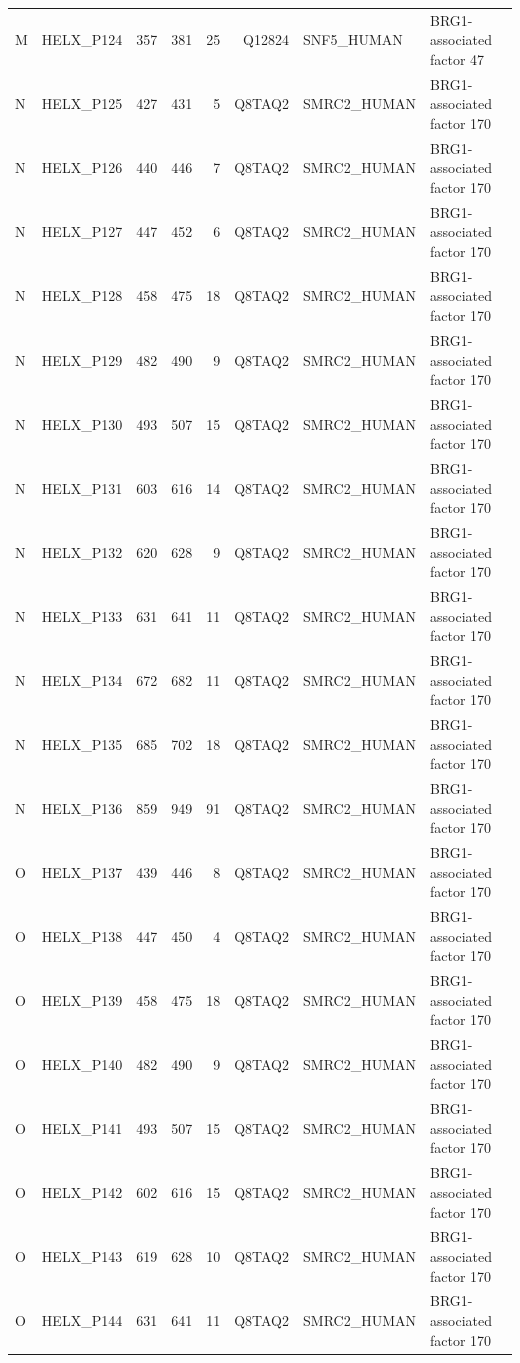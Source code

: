 \begin{longtable}{@{}llrrrrllp{5.2cm}@{}}
  M & HELX_P124 & 357 & 381 & 25 & Q12824 & SNF5_HUMAN & BRG1-associated factor 47 \\
  N & HELX_P125 & 427 & 431 & 5 & Q8TAQ2 & SMRC2_HUMAN & BRG1-associated factor 170 \\
  N & HELX_P126 & 440 & 446 & 7 & Q8TAQ2 & SMRC2_HUMAN & BRG1-associated factor 170 \\
  N & HELX_P127 & 447 & 452 & 6 & Q8TAQ2 & SMRC2_HUMAN & BRG1-associated factor 170 \\
  N & HELX_P128 & 458 & 475 & 18 & Q8TAQ2 & SMRC2_HUMAN & BRG1-associated factor 170 \\
  N & HELX_P129 & 482 & 490 & 9 & Q8TAQ2 & SMRC2_HUMAN & BRG1-associated factor 170 \\
  N & HELX_P130 & 493 & 507 & 15 & Q8TAQ2 & SMRC2_HUMAN & BRG1-associated factor 170 \\
  N & HELX_P131 & 603 & 616 & 14 & Q8TAQ2 & SMRC2_HUMAN & BRG1-associated factor 170 \\
  N & HELX_P132 & 620 & 628 & 9 & Q8TAQ2 & SMRC2_HUMAN & BRG1-associated factor 170 \\
  N & HELX_P133 & 631 & 641 & 11 & Q8TAQ2 & SMRC2_HUMAN & BRG1-associated factor 170 \\
  N & HELX_P134 & 672 & 682 & 11 & Q8TAQ2 & SMRC2_HUMAN & BRG1-associated factor 170 \\
  N & HELX_P135 & 685 & 702 & 18 & Q8TAQ2 & SMRC2_HUMAN & BRG1-associated factor 170 \\
  N & HELX_P136 & 859 & 949 & 91 & Q8TAQ2 & SMRC2_HUMAN & BRG1-associated factor 170 \\
  O & HELX_P137 & 439 & 446 & 8 & Q8TAQ2 & SMRC2_HUMAN & BRG1-associated factor 170 \\
  O & HELX_P138 & 447 & 450 & 4 & Q8TAQ2 & SMRC2_HUMAN & BRG1-associated factor 170 \\
  O & HELX_P139 & 458 & 475 & 18 & Q8TAQ2 & SMRC2_HUMAN & BRG1-associated factor 170 \\
  O & HELX_P140 & 482 & 490 & 9 & Q8TAQ2 & SMRC2_HUMAN & BRG1-associated factor 170 \\
  O & HELX_P141 & 493 & 507 & 15 & Q8TAQ2 & SMRC2_HUMAN & BRG1-associated factor 170 \\
  O & HELX_P142 & 602 & 616 & 15 & Q8TAQ2 & SMRC2_HUMAN & BRG1-associated factor 170 \\
  O & HELX_P143 & 619 & 628 & 10 & Q8TAQ2 & SMRC2_HUMAN & BRG1-associated factor 170 \\
  O & HELX_P144 & 631 & 641 & 11 & Q8TAQ2 & SMRC2_HUMAN & BRG1-associated factor 170 \\

\end{longtable}
